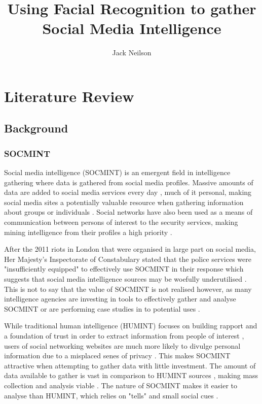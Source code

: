 \documentclass{article}
\begin{document}
\title{Using Facial Recognition to gather Social Media Intelligence}
\author{Jack Neilson}
\maketitle
\newpage
\tableofcontents
\newpage

\section{Literature Review}
\subsection{Background}
\subsubsection{SOCMINT}
Social media intelligence (SOCMINT) is an emergent field in intelligence gathering where data is gathered from social media profiles. Massive amounts of data are added to social media services every day \citep{socmintoverview}, much of it personal, making social media sites a potentially valuable resource when gathering information about groups or individuals \citep{gchqmasssurveillance}. Social networks have also been used as a means of communication between persons of interest to the security services, making mining intelligence from their profiles a high priority \citep{socmintoverview}\citep{policesocmint}.

After the 2011 riots in London that were organised in large part on social media, Her Majesty's Inspectorate of Constabulary stated that the police services were "insufficiently equipped" to effectively use SOCMINT in their response \citep{socmintpublicsafety} which suggests that social media intelligence sources may be woefully underutilised \citep{socmintoverview}. This is not to say that the value of SOCMINT is not realised however, as many intelligence agencies are investing in tools to effectively gather and analyse SOCMINT \citep{socmintpublicsafety} or are performing case studies in to potential uses \citep{bostonbombingcasestudy}.

While traditional human intelligence (HUMINT) focuses on building rapport and a foundation of trust in order to extract information from people of interest \citep{humintinterrogators}, users of social networking websites are much more likely to divulge personal information due to a misplaced senes of privacy \citep{socialmediacontent}. This makes SOCMINT attractive when attempting to gather data with little investment. The amount of data available to gather is vast in comparison to HUMINT sources \citep{socmintoverview}, making mass collection and analysis viable \citep{prismslides}. The nature of SOCMINT makes it easier to analyse than HUMINT, which relies on "tells" and small social cues \citep{humintinterrogators}.
\end{document}
